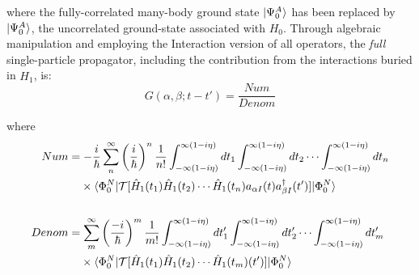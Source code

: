 \noindent
where the fully-correlated many-body ground state $\ket{\Psi^{A}_{0}}$ has been replaced by
$\ket{\Psi^{A}_{0}}$, the uncorrelated ground-state associated with $H_{0}$. Through algebraic
manipulation and employing the Interaction version of all operators,
the \textit{full} single-particle propagator, including the
contribution from the interactions buried in $\hat{H_{1}}$, is:
\begin{equation} \label{FullSPPropagator}
    G(\alpha, \beta; t-t') = \frac{Num}{Denom}
\end{equation}

\noindent
where
\begin{equation*}
    \begin{split}
        Num & = -\frac{i}{\hbar}\sum^{\infty}_{n}\left(\frac{i}{\hbar}\right)^{n}\frac{1}{n!}
    \int_{-\infty(1-i\eta)}^{\infty(1-i\eta)} dt_{1}
    \int_{-\infty(1-i\eta)}^{\infty(1-i\eta)} dt_{2} \cdots
    \int_{-\infty(1-i\eta)}^{\infty(1-i\eta)} dt_{n}\\
    & \phantom{ {}= } \times \braket{\Phi^{N}_{0}|\mathcal{T}[\hat{H}_{1}(t_{1})
    \hat{H}_{1}(t_{2}) \cdots \hat{H}_{1}(t_{n})a_{\alpha I}(t)a^{\dagger}_{\beta
    I}(t')]|\Phi^{N}_{0}}\\\\
    Denom & = \sum^{\infty}_{m}\left(\frac{-i}{\hbar}\right)^{m}\frac{1}{m!}
        \int_{-\infty(1-i\eta)}^{\infty(1-i\eta)} dt'_{1}
        \int_{-\infty(1-i\eta)}^{\infty(1-i\eta)} dt'_{2} \cdots
        \int_{-\infty(1-i\eta)}^{\infty(1-i\eta)} dt'_{m}\\
        & \phantom{ {}= } \times \braket{\Phi^{N}_{0}|
        \mathcal{T}[\hat{H}_{1}(t_{1})
        \hat{H}_{1}(t_{2}) \cdots \hat{H}_{1}(t_{m})(t')]|\Phi^{N}_{0}}
    \end{split}
\end{equation*}

